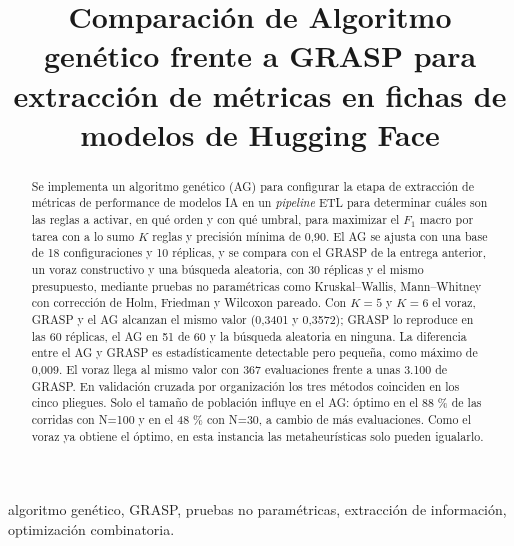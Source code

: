 \documentclass[conference]{IEEEtran}
\begin{document}
	
	\newcommand{\pcsel}{\textbf{[PC]}}
	\newcommand{\pmsel}{\textbf{[PM]}}
	
	\title{Comparación de Algoritmo gen\'etico frente a GRASP para extracci\'on de m\'etricas en fichas de modelos de Hugging Face}
	
	\author{
		}
	
	\maketitle
	
	\begin{abstract}
		Se implementa un algoritmo gen\'etico (AG) para configurar la etapa de extracción de métricas de performance de modelos IA en un \emph{pipeline} ETL   para determinar cuáles son las reglas a activar, en qué orden y con qu\'e umbral, para maximizar el $F_1$ macro por tarea con a lo sumo $K$ reglas y precisi\'on m\'inima de 0,90. El AG se ajusta con una base de 18 configuraciones y 10 r\'eplicas, y se compara con el GRASP de la entrega anterior, un voraz constructivo y una b\'usqueda aleatoria, con 30 r\'eplicas y el mismo presupuesto, mediante pruebas no paramétricas como Kruskal--Wallis, Mann--Whitney con correcci\'on de Holm, Friedman y Wilcoxon pareado. Con $K=5$ y $K=6$ el voraz, GRASP y el AG alcanzan el mismo valor (0,3401 y 0,3572); GRASP lo reproduce en las 60 r\'eplicas, el AG en 51 de 60 y la b\'usqueda aleatoria en ninguna. La diferencia entre el AG y GRASP es estad\'isticamente detectable pero pequeña, como m\'aximo de 0,009. El voraz llega al mismo valor con 367 evaluaciones frente a unas 3.100 de GRASP. En validaci\'on cruzada por organizaci\'on los tres m\'etodos coinciden en los cinco pliegues. Solo el tamaño de población influye en el AG: óptimo en el 88 \% de las corridas con N=100 y en el 48 \% con N=30, a cambio de más evaluaciones. Como el voraz ya obtiene el óptimo, en esta instancia las metaheurísticas solo pueden igualarlo.
	\end{abstract}
	
	\begin{IEEEkeywords}
		algoritmo gen\'etico, GRASP, pruebas no param\'etricas, extracci\'on de informaci\'on, optimizaci\'on combinatoria.
	\end{IEEEkeywords}
	
\end{document}
